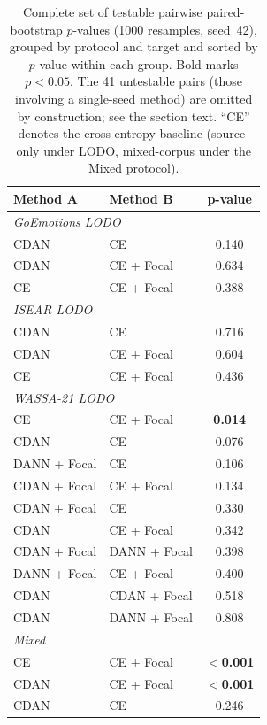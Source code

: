 \begin{table}[t]
\centering
\small
\begin{tabular}{llc}
\toprule
\textbf{Method A} & \textbf{Method B} & \textbf{p-value} \\
\midrule
\multicolumn{3}{l}{\emph{GoEmotions LODO}} \\
CDAN        & CE          & 0.140 \\
CDAN        & CE + Focal  & 0.634 \\
CE          & CE + Focal  & 0.388 \\
\midrule
\multicolumn{3}{l}{\emph{ISEAR LODO}} \\
CDAN        & CE          & 0.716 \\
CDAN        & CE + Focal  & 0.604 \\
CE          & CE + Focal  & 0.436 \\
\midrule
\multicolumn{3}{l}{\emph{WASSA-21 LODO}} \\
CE          & CE + Focal     & \textbf{0.014} \\
CDAN        & CE             & 0.076 \\
DANN + Focal & CE            & 0.106 \\
CDAN + Focal & CE + Focal    & 0.134 \\
CDAN + Focal & CE            & 0.330 \\
CDAN        & CE + Focal     & 0.342 \\
CDAN + Focal & DANN + Focal  & 0.398 \\
DANN + Focal & CE + Focal    & 0.400 \\
CDAN        & CDAN + Focal   & 0.518 \\
CDAN        & DANN + Focal   & 0.808 \\
\midrule
\multicolumn{3}{l}{\emph{Mixed}} \\
CE          & CE + Focal  & \textbf{$<$0.001} \\
CDAN        & CE + Focal  & \textbf{$<$0.001} \\
CDAN        & CE          & 0.246 \\
\bottomrule
\end{tabular}
\caption{Complete set of testable pairwise paired-bootstrap
$p$-values (1000 resamples, seed~42), grouped by protocol and target
and sorted by $p$-value within each group. Bold marks $p < 0.05$. The
41 untestable pairs (those involving a single-seed method) are omitted
by construction; see the section text. ``CE'' denotes the
cross-entropy baseline (source-only under LODO, mixed-corpus under the
Mixed protocol).}
\label{tab:fullbootstrap}
\end{table}
